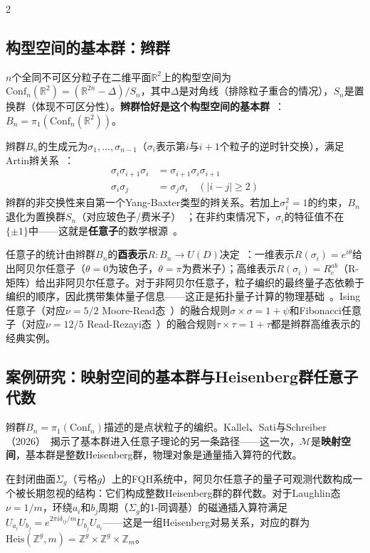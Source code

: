 \documentclass[a4paper,11pt]{ctexart}
\begin{document}
\begin{multicols}{2}
\subsection{构型空间的基本群：辫群}

$n$个全同不可区分粒子在二维平面$\mathbb{R}^2$上的构型空间为$\mathrm{Conf}_n(\mathbb{R}^2)=(\mathbb{R}^{2n}-\Delta)/S_n$，其中$\Delta$是对角线（排除粒子重合的情况），$S_n$是置换群（体现不可区分性）。\textbf{辫群恰好是这个构型空间的基本群}~\cite{Birman1974,Nakahara2003}：$B_n=\pi_1(\mathrm{Conf}_n(\mathbb{R}^2))$。

辫群$B_n$的生成元为$\sigma_1,\ldots,\sigma_{n-1}$（$\sigma_i$表示第$i$与$i+1$个粒子的逆时针交换），满足Artin辫关系~\cite{Birman1974}：
\begin{align}
\sigma_i\sigma_{i+1}\sigma_i&=\sigma_{i+1}\sigma_i\sigma_{i+1}\\
\sigma_i\sigma_j&=\sigma_j\sigma_i\quad(|i-j|\ge2)
\end{align}
辫群的非交换性来自第一个Yang-Baxter类型的辫关系。若加上$\sigma_i^2=1$的约束，$B_n$退化为置换群$S_n$（对应玻色子/费米子）~\cite{Birman1974,Nakahara2003}；在非约束情况下，$\sigma_i$的特征值不在$\{\pm1\}$中——这就是\textbf{任意子}的数学根源~\cite{Nayak2008}。

任意子的统计由辫群$B_n$的\textbf{酉表示}$R:B_n\to U(D)$决定~\cite{Nayak2008}：一维表示$R(\sigma_i)=e^{i\theta}$给出阿贝尔任意子（$\theta=0$为玻色子，$\theta=\pi$为费米子）；高维表示$R(\sigma_i)=R^{ab}_c$（R-矩阵）给出非阿贝尔任意子。对于非阿贝尔任意子，粒子编织的最终量子态依赖于编织的顺序，因此携带集体量子信息——这正是拓扑量子计算的物理基础~\cite{Kitaev2006,Nayak2008}。Ising任意子（对应$\nu=5/2$ Moore-Read态~\cite{Moore1991}）的融合规则$\sigma\times\sigma=1+\psi$和Fibonacci任意子（对应$\nu=12/5$ Read-Rezayi态~\cite{Read1999}）的融合规则$\tau\times\tau=1+\tau$都是辫群高维表示的经典实例。

\subsection{案例研究：映射空间的基本群与Heisenberg群任意子代数}

辫群$B_n=\pi_1(\mathrm{Conf}_n)$描述的是点状粒子的编织。Kallel、Sati与Schreiber（2026）~\cite{Kallel2026Anyons}揭示了基本群进入任意子理论的另一条路径——这一次，$\mathcal{M}$是\textbf{映射空间}，基本群是整数Heisenberg群，物理对象是通量插入算符的代数。

在封闭曲面$\Sigma_g$（亏格$g$）上的FQH系统中，阿贝尔任意子的量子可观测代数构成一个被长期忽视的结构：它们构成整数Heisenberg群的群代数。对于Laughlin态$\nu=1/m$，环绕$a_i$和$b_j$周期（$\Sigma_g$的1-同调基）的磁通插入算符满足$U_{a_i}U_{b_j}=e^{2\pi i\delta_{ij}/m}U_{b_j}U_{a_i}$——这是一组Heisenberg对易关系，对应的群为$\mathrm{Heis}(\mathbb{Z}^g,m)=\mathbb{Z}^g\times\mathbb{Z}^g\times\mathbb{Z}_m$。


\end{multicols}
\end{document}
